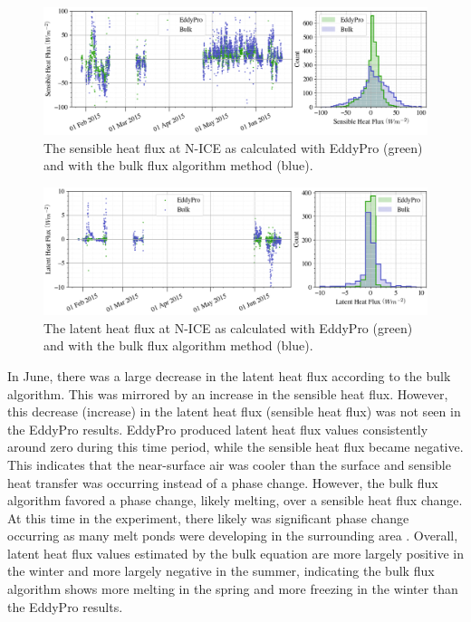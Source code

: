 \begin{figure}[h!]
    \centering
    \includegraphics[width=1\linewidth]{figures/chapter5/BulkSensible.png}
    \caption[Sensible heat flux from a bulk flux method compared to EddyPro.]{The sensible heat flux at N-ICE as calculated with EddyPro (green) and with the bulk flux algorithm method (blue).}
    \label{fig:bulk:sensible}
\end{figure}
\begin{figure}[h!]
    \centering
    \includegraphics[width=1\linewidth]{figures/chapter5/BulkLatent.png}
    \caption[Latent heat flux from a bulk flux method compared to EddyPro.]{The latent heat flux at N-ICE as calculated with EddyPro (green) and with the bulk flux algorithm method (blue).}
    \label{fig:bulk:latent}
\end{figure}

In June, there was a large decrease in the latent heat flux according to the bulk algorithm. This was mirrored by an increase in the sensible heat flux. However, this decrease (increase) in the latent heat flux (sensible heat flux) was not seen in the EddyPro results. EddyPro produced latent heat flux values consistently around zero during this time period, while the sensible heat flux became negative. This indicates that the near-surface air was cooler than the surface and sensible heat transfer was occurring instead of a phase change. However, the bulk flux algorithm favored a phase change, likely melting, over a sensible heat flux change. At this time in the experiment, there likely was significant phase change occurring as many melt ponds were developing in the surrounding area \citep{walden:2017}. Overall, latent heat flux values estimated by the bulk equation are more largely positive in the winter and more largely negative in the summer, indicating the bulk flux algorithm shows more melting in the spring and more freezing in the winter than the EddyPro results. 

